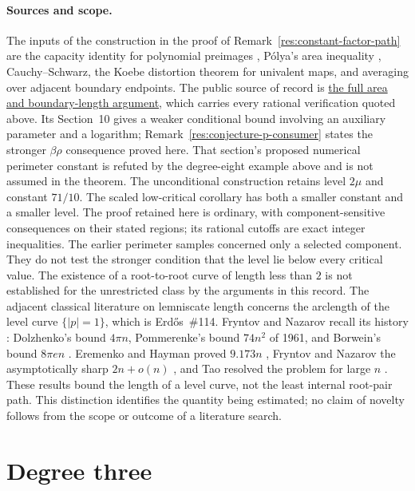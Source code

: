 \documentclass[11pt]{article}
\begin{document}
\paragraph{Sources and scope.}
\label{bdry:constant-factor}
The inputs of the construction in the proof of
Remark~\ref{res:constant-factor-path} are the capacity identity for polynomial
preimages \cite[\S2]{crane}, P\'olya's area inequality \cite[Theorem~1]{crane},
Cauchy--Schwarz, the Koebe distortion theorem for univalent maps, and
averaging over adjacent boundary endpoints.  The public source
of record is
\href{https://github.com/wcook04/plectis-erdos/blob/f214a6b45528dc5eefe20ffadc35f2e981627d4c/research_corpus/Erdos1041/UnconditionalConstantFactorBound.md}{the full area and boundary-length argument}, which
carries every rational verification quoted above. Its Section~10 gives
a weaker conditional bound involving an auxiliary parameter and a
logarithm; Remark~\ref{res:conjecture-p-consumer} states the stronger
$\beta\rho$ consequence proved here. That section's proposed numerical
perimeter constant is refuted by the degree-eight example above and is
not assumed in the theorem. The unconditional construction retains
level $2\mu$ and constant $71/10$.
The scaled low-critical corollary has both a smaller constant and a smaller
level.  The proof retained here is ordinary, with component-sensitive
consequences on their stated regions; its rational cutoffs are exact integer
inequalities.  The earlier perimeter samples concerned only a selected component.
They do not test the stronger condition that the level lie below every
critical value.
The existence of a root-to-root curve of length less than $2$ is not established for the unrestricted
class by the arguments in this record.
The adjacent classical literature on
lemniscate length concerns the arclength of the level curve $\{|p|=1\}$, which
is Erd\H{o}s~\#114.  Fryntov and Nazarov recall its history
\cite[Introduction]{fryntovnazarov2008}: Dolzhenko's bound $4\pi n$,
Pommerenke's bound $74n^2$ of 1961, and Borwein's bound $8\pi en$
\cite{borwein1995}.  Eremenko and Hayman proved $9.173n$
\cite[Theorem~1]{eremenkohayman1999}, Fryntov and Nazarov the asymptotically
sharp $2n+o(n)$ \cite{fryntovnazarov2008}, and Tao resolved the problem for
large $n$ \cite{tao2025}.  These results bound the length of a level curve, not the least internal
root-pair path.  This distinction identifies the quantity being estimated;
no claim of novelty follows from the scope or outcome of a literature search.

\section{Degree three}
\label{sec:degree-three}
\end{document}
